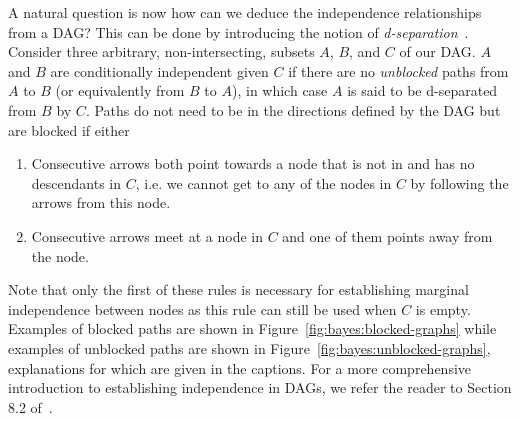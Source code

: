 A natural question is now how can we deduce the independence relationships from a DAG?
This can be done by introducing the notion of \emph{d-separation}~\citep{pearl2014probabilistic}.
Consider three arbitrary, non-intersecting, subsets $A$, $B$, and $C$ of our DAG.  $A$ and $B$
are conditionally independent given $C$ if there are no \emph{unblocked} paths from $A$ to $B$
(or equivalently from $B$ to $A$), in which case $A$ is said to be d-separated from $B$ by $C$.  
Paths do not need to be in the directions defined by the DAG but are blocked if either
\begin{enumerate}
		\setlength\itemsep{-0.1em}
	\item Consecutive arrows both point towards a node that is not in and
	has no descendants in $C$, i.e. we cannot get to any of the nodes in $C$ by following the arrows
	from this node.
	\item Consecutive arrows meet at a node in $C$ and one of them
	points away from the node.
\end{enumerate}
Note that only the first of these rules is necessary for establishing marginal independence
between nodes as this rule can still be used when $C$ is empty.
Examples of blocked paths are shown in Figure~\ref{fig:bayes:blocked-graphs} while examples of unblocked paths
are shown in Figure~\ref{fig:bayes:unblocked-graphs}, explanations for which are given in the captions.
For a more comprehensive introduction to establishing independence in DAGs, we
refer the reader to Section 8.2 of~\cite{bishop2006pattern}.

